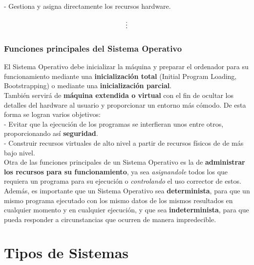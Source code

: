\documentclass[spanish, 12pt]{article}
\begin{document}
				- Gestiona y asigna directamente los recursos hardware.
				
				\begin{equation}
					\notag
					\vdots
				\end{equation}
				
				\newpage
		
			\subsubsection{Funciones principales del Sistema Operativo}
		
				El Sistema Operativo debe inicializar la máquina y preparar el ordenador para su funcionamiento mediante una \textbf{inicialización total} (Initial Program Loading, Bootstrapping) o mediante una \textbf{inicialización parcial}.\\
				
				También servirá de \textbf{máquina extendida o virtual} con el fin de ocultar los detalles del hardware al usuario y proporcionar un entorno más cómodo. De esta forma se logran varios objetivos:\\
				
				- Evitar que la ejecución de los programas se interfieran unos entre otros, proporcionando así \textbf{seguridad}.\\
				
				- Construir recursos virtuales de alto nivel a partir de recursos físicos de de más bajo nivel.\\
				
				Otra de las funciones principales de un Sistema Operativo es la de \textbf{administrar los recursos para su funcionamiento}, ya sea \textit{asignandole} todos los que requiera un programa para su ejecución o \textit{controlando} el uso corrector de estos.\\
				
				Además, es importante que un Sistema Operativo sea \textbf{determinista}, para que un mismo programa ejecutado con los mismo datos de los mismos resultados en cualquier momento y en cualquier ejecución, y que sea \textbf{indeterminista}, para que pueda responder a circunstancias que ocurren de manera impredecible.
				
				\newpage
				
	\section{Tipos de Sistemas}
	
\end{document}
